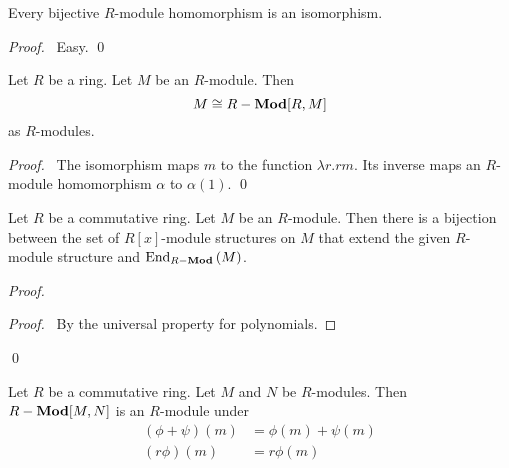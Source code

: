 \begin{prop}
Every bijective $R$-module homomorphism is an isomorphism.
\end{prop}

\begin{proof}
\pf\ Easy. \qed
\end{proof}

\begin{prop}
Let $R$ be a ring. Let $M$ be an $R$-module. Then
\[ M \cong {R}-\mathbf{Mod}[R,M] \]
as $R$-modules.
\end{prop}

\begin{proof}
\pf\ The isomorphism maps $m$ to the function $\lambda r.rm$. Its inverse maps an $R$-module homomorphism $\alpha$ to $\alpha(1)$. \qed
\end{proof}

\begin{prop}
Let $R$ be a commutative ring. Let $M$ be an $R$-module. Then there is a bijection between the set of $R[x]$-module structures on $M$ that extend the given $R$-module structure and $\mathrm{End}_{{R}-\mathbf{Mod}} \left( {M} \right)$.
\end{prop}

\begin{proof}
\pf
{}
\begin{proof}
	\pf\ By the universal property for polynomials.
\end{proof}
\qed
\end{proof}

\begin{prop}
Let $R$ be a commutative ring. Let $M$ and $N$ be $R$-modules. Then ${R}-\mathbf{Mod}[M,N]$ is an $R$-module under
\begin{align*}
(\phi + \psi)(m) & = \phi(m) + \psi(m) \\
(r \phi)(m) & = r \phi(m)
\end{align*}
\end{prop}

